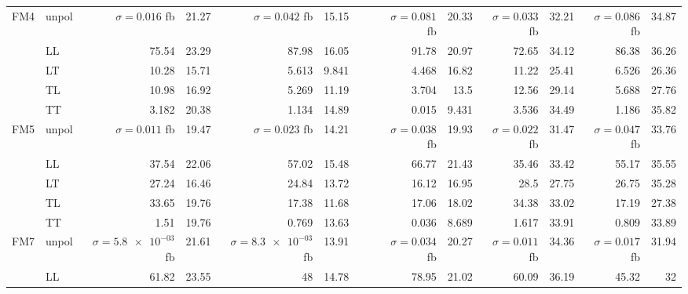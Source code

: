 \begin{table}[h]
{\begin{tabular}{llrrrrrrrrrrrr}
\midrule
\multirow{5}{*}{FM4}
 & unpol & $\sigma = \num{0.016}$ fb & \num{21.27} & $\sigma = \num{0.042}$ fb & \num{15.15} &  &  & $\sigma = \num{0.081}$ fb & \num{20.33} & $\sigma = \num{0.033}$ fb & \num{32.21} & $\sigma = \num{0.086}$ fb & \num{34.87} \\
 & LL & \num{75.54} & \num{23.29} & \num{87.98} & \num{16.05} &  &  & \num{91.78} & \num{20.97} & \num{72.65} & \num{34.12} & \num{86.38} & \num{36.26} \\
 & LT & \num{10.28} & \num{15.71} & \num{5.613} & \num{9.841} &  &  & \num{4.468} & \num{16.82} & \num{11.22} & \num{25.41} & \num{6.526} & \num{26.36} \\
 & TL & \num{10.98} & \num{16.92} & \num{5.269} & \num{11.19} &  &  & \num{3.704} & \num{13.5} & \num{12.56} & \num{29.14} & \num{5.688} & \num{27.76} \\
 & TT & \num{3.182} & \num{20.38} & \num{1.134} & \num{14.89} &  &  & \num{0.015} & \num{9.431} & \num{3.536} & \num{34.49} & \num{1.186} & \num{35.82} \\
\midrule
\multirow{5}{*}{FM5}
 & unpol & $\sigma = \num{0.011}$ fb & \num{19.47} & $\sigma = \num{0.023}$ fb & \num{14.21} &  &  & $\sigma = \num{0.038}$ fb & \num{19.93} & $\sigma = \num{0.022}$ fb & \num{31.47} & $\sigma = \num{0.047}$ fb & \num{33.76} \\
 & LL & \num{37.54} & \num{22.06} & \num{57.02} & \num{15.48} &  &  & \num{66.77} & \num{21.43} & \num{35.46} & \num{33.42} & \num{55.17} & \num{35.55} \\
 & LT & \num{27.24} & \num{16.46} & \num{24.84} & \num{13.72} &  &  & \num{16.12} & \num{16.95} & \num{28.5} & \num{27.75} & \num{26.75} & \num{35.28} \\
 & TL & \num{33.65} & \num{19.76} & \num{17.38} & \num{11.68} &  &  & \num{17.06} & \num{18.02} & \num{34.38} & \num{33.02} & \num{17.19} & \num{27.38} \\
 & TT & \num{1.51} & \num{19.76} & \num{0.769} & \num{13.63} &  &  & \num{0.036} & \num{8.689} & \num{1.617} & \num{33.91} & \num{0.809} & \num{33.89} \\
\midrule
\multirow{5}{*}{FM7}
 & unpol & $\sigma = \num{5.8e-03}$ fb & \num{21.61} & $\sigma = \num{8.3e-03}$ fb & \num{13.91} &  &  & $\sigma = \num{0.034}$ fb & \num{20.27} & $\sigma = \num{0.011}$ fb & \num{34.36} & $\sigma = \num{0.017}$ fb & \num{31.94} \\
 & LL & \num{61.82} & \num{23.55} & \num{48} & \num{14.78} &  &  & \num{78.95} & \num{21.02} & \num{60.09} & \num{36.19} & \num{45.32} & \num{32} \\

\end{tabular}}
\end{table}
